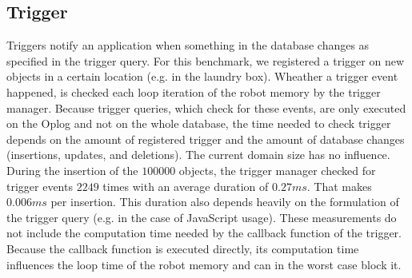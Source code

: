 \subsection{Trigger}
\label{sec:eval-trigger}
Triggers notify an application when something in the database changes
as specified in the trigger query. For this benchmark, we registered a
trigger on new objects in a certain location (e.g. in the laundry
box). Wheather a trigger event happened, is checked each loop iteration of
the robot memory by the trigger manager. Because trigger queries,
which check for these events, are only executed on the Oplog and not
on the whole database, the time needed to check trigger depends on the
amount of registered trigger and the amount of database changes
(insertions, updates, and deletions). The current domain size has no
influence. During the insertion of the $100000$ objects, the trigger
manager checked for trigger events $2249$ times with an average
duration of $0.27ms$. That makes $0.006ms$ per insertion. This
duration also depends heavily on the formulation of the trigger query
(e.g. in the case of JavaScript usage). These measurements do not
include the computation time needed by the callback function of the
trigger. Because the callback function is executed directly, its
computation time influences the loop time of the robot memory and can
in the worst case block it.

